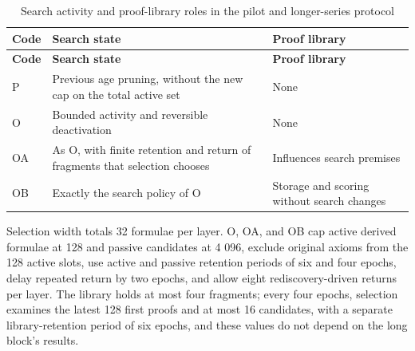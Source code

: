 \documentclass[pdflatex,sn-basic,Numbered]{sn-jnl}
\begin{document}
\begin{longtable}[]{@{}
  >{\raggedright\arraybackslash}p{}
  >{\raggedright\arraybackslash}p{}
  >{\raggedright\arraybackslash}p{}@{}}
\caption{Search activity and proof-library roles in the pilot and longer-series protocol}\label{tab:12}\tabularnewline
\toprule\noalign{}
\begin{minipage}[b]{\linewidth}\raggedright
\textbf{Code}
\end{minipage} & \begin{minipage}[b]{\linewidth}\raggedright
\textbf{Search state}
\end{minipage} & \begin{minipage}[b]{\linewidth}\raggedright
\textbf{Proof library}
\end{minipage} \\
\midrule\noalign{}
\endfirsthead
\toprule\noalign{}
\begin{minipage}[b]{\linewidth}\raggedright
\textbf{Code}
\end{minipage} & \begin{minipage}[b]{\linewidth}\raggedright
\textbf{Search state}
\end{minipage} & \begin{minipage}[b]{\linewidth}\raggedright
\textbf{Proof library}
\end{minipage} \\
\midrule\noalign{}
\endhead
\bottomrule\noalign{}
\endlastfoot
P & Previous age pruning, without the new cap on the total active set & None \\
O & Bounded activity and reversible deactivation & None \\
OA & As O, with finite retention and return of fragments that selection chooses & Influences search premises \\
OB & Exactly the search policy of O & Storage and scoring without search changes \\
\end{longtable}

\endgroup

Selection width totals 32 formulae per layer. O, OA, and OB cap active derived formulae at 128 and passive candidates at 4 096, exclude original axioms from the 128 active slots, use active and passive retention periods of six and four epochs, delay repeated return by two epochs, and allow eight rediscovery-driven returns per layer. The library holds at most four fragments; every four epochs, selection examines the latest 128 first proofs and at most 16 candidates, with a separate library-retention period of six epochs, and these values do not depend on the long block's results.
\end{document}
